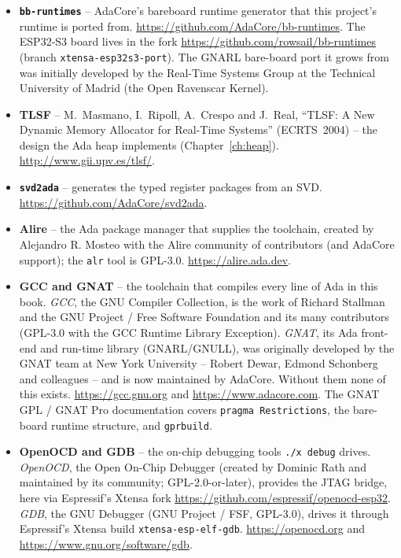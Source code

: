\begin{itemize}
\item \textbf{\texttt{bb-runtimes}} -- AdaCore's bareboard runtime generator that
  this project's runtime is ported from.
  \url{https://github.com/AdaCore/bb-runtimes}. The ESP32-S3 board lives in the
  fork \url{https://github.com/rowsail/bb-runtimes} (branch
  \texttt{xtensa-esp32s3-port}). The GNARL bare-board port it grows from was
  initially developed by the Real-Time Systems Group at the Technical University
  of Madrid (the Open Ravenscar Kernel).
\item \textbf{TLSF} -- M.~Masmano, I.~Ripoll, A.~Crespo and J.~Real, ``TLSF: A New
  Dynamic Memory Allocator for Real-Time Systems'' (ECRTS~2004) -- the design the
  Ada heap implements (Chapter~\ref{ch:heap}). \url{http://www.gii.upv.es/tlsf/}.
\item \textbf{\texttt{svd2ada}} -- generates the typed register packages from an
  SVD. \url{https://github.com/AdaCore/svd2ada}.
\item \textbf{Alire} -- the Ada package manager that supplies the toolchain,
  created by Alejandro R. Mosteo with the Alire community of contributors (and
  AdaCore support); the \texttt{alr} tool is GPL-3.0. \url{https://alire.ada.dev}.
\item \textbf{GCC and GNAT} -- the toolchain that compiles every line of Ada in
  this book. \emph{GCC}, the GNU Compiler Collection, is the work of Richard
  Stallman and the GNU Project / Free Software Foundation and its many
  contributors (GPL-3.0 with the GCC Runtime Library Exception). \emph{GNAT}, its
  Ada front-end and run-time library (GNARL/GNULL), was originally developed by the
  GNAT team at New York University -- Robert Dewar, Edmond Schonberg and colleagues
  -- and is now maintained by AdaCore. Without them none of this exists.
  \url{https://gcc.gnu.org} and \url{https://www.adacore.com}. The GNAT GPL / GNAT
  Pro documentation covers \texttt{pragma Restrictions}, the bare-board runtime
  structure, and \texttt{gprbuild}.
\item \textbf{OpenOCD and GDB} -- the on-chip debugging tools \texttt{./x debug}
  drives. \emph{OpenOCD}, the Open On-Chip Debugger (created by Dominic Rath and
  maintained by its community; GPL-2.0-or-later), provides the JTAG bridge, here
  via Espressif's Xtensa fork \url{https://github.com/espressif/openocd-esp32}.
  \emph{GDB}, the GNU Debugger (GNU Project / FSF, GPL-3.0), drives it through
  Espressif's Xtensa build \texttt{xtensa-esp-elf-gdb}. \url{https://openocd.org}
  and \url{https://www.gnu.org/software/gdb}.
\end{itemize}


